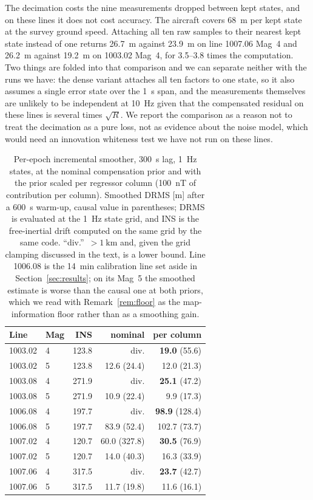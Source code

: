 The decimation costs the nine measurements dropped between kept states, and on
these lines it does not cost accuracy. The aircraft covers \SI{68}{\meter} per
kept state at the survey ground speed. Attaching all ten raw samples to their
nearest kept state instead of one returns \SI{26.7}{\meter} against
\SI{23.9}{\meter} on line 1007.06 Mag~4 and \SI{26.2}{\meter} against
\SI{19.2}{\meter} on 1003.02 Mag~4, for \numrange{3.5}{3.8} times the
computation. Two things are folded into that comparison and we can separate
neither with the runs we have: the dense variant attaches all ten factors to one
state, so it also assumes a single error state over the \SI{1}{\second} span, and
the measurements themselves are unlikely to be independent at \SI{10}{\hertz}
given that the compensated residual on these lines is several times $\sqrt{R}$. We
report the comparison as a reason not to treat the decimation as a pure loss, not
as evidence about the noise model, which would need an innovation whiteness test
we have not run on these lines.

\begin{table}[t]
\caption{Per-epoch incremental smoother, \SI{300}{\second} lag, \SI{1}{\hertz}
states, at the nominal compensation prior and with the prior scaled per regressor
column (\SI{100}{\nano\tesla} of contribution per column). Smoothed DRMS [m]
after a \SI{600}{\second} warm-up, causal value in parentheses; DRMS is evaluated
at the \SI{1}{\hertz} state grid, and INS is the free-inertial drift computed on
the same grid by the same code. ``div.''\ $>\SI{1}{\kilo\meter}$ and, given the
grid clamping discussed in the text, is a lower bound. Line 1006.08 is the
\SI{14}{\minute} calibration line set aside in Section~\ref{sec:results}; on its
Mag~5 the smoothed estimate is worse than the causal one at both priors, which we
read with Remark~\ref{rem:floor} as the map-information floor rather than as a
smoothing gain.}
\label{tab:incprior}
\centering
\setlength{\tabcolsep}{4pt}
\begin{tabular}{llr rr}
\toprule
Line & Mag & INS & nominal & per column \\
\midrule
1003.02 & 4 & 123.8 & div. & \textbf{19.0} (55.6) \\
1003.02 & 5 & 123.8 & 12.6 (24.4) & 12.0 (21.3) \\
1003.08 & 4 & 271.9 & div. & \textbf{25.1} (47.2) \\
1003.08 & 5 & 271.9 & 10.9 (22.4) & 9.9 (17.3) \\
1006.08 & 4 & 197.7 & div. & \textbf{98.9} (128.4) \\
1006.08 & 5 & 197.7 & 83.9 (52.4) & 102.7 (73.7) \\
1007.02 & 4 & 120.7 & 60.0 (327.8) & \textbf{30.5} (76.9) \\
1007.02 & 5 & 120.7 & 14.0 (40.3) & 16.3 (33.9) \\
1007.06 & 4 & 317.5 & div. & \textbf{23.7} (42.7) \\
1007.06 & 5 & 317.5 & 11.7 (19.8) & 11.6 (16.1) \\
\bottomrule
\end{tabular}
\end{table}

